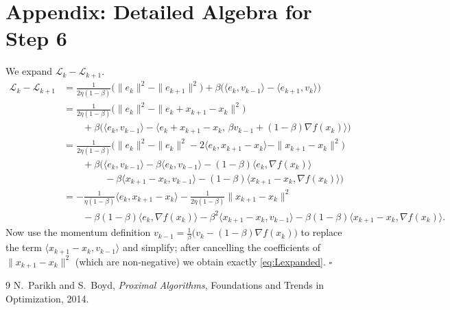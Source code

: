 \documentclass{article}
\newcommand{\grad}{\nabla}
\begin{document}
\section*{Appendix: Detailed Algebra for Step 6}
We expand $\mathcal{L}_{k}-\mathcal{L}_{k+1}$.
\[
\begin{aligned}
\mathcal{L}_{k}-\mathcal{L}_{k+1}
&= \frac{1}{2\eta(1-\beta)}\bigl(\|e_{k}\|^{2}-\|e_{k+1}\|^{2}\bigr)
   +\beta\bigl(\langle e_{k},v_{k-1}\rangle-\langle e_{k+1},v_{k}\rangle\bigr)\\[4pt]
&= \frac{1}{2\eta(1-\beta)}\bigl(\|e_{k}\|^{2}-\|e_{k}+x_{k+1}-x_{k}\|^{2}\bigr)\\
&\qquad +\beta\bigl(\langle e_{k},v_{k-1}\rangle-\langle e_{k}+x_{k+1}-x_{k},\,
           \beta v_{k-1}+(1-\beta)\grad f(x_{k})\rangle\bigr)\\[4pt]
&= \frac{1}{2\eta(1-\beta)}\bigl(\|e_{k}\|^{2}-\|e_{k}\|^{2}
      -2\langle e_{k},x_{k+1}-x_{k}\rangle-\|x_{k+1}-x_{k}\|^{2}\bigr)\\
&\qquad +\beta\bigl(\langle e_{k},v_{k-1}\rangle
      -\beta\langle e_{k},v_{k-1}\rangle
      -(1-\beta)\langle e_{k},\grad f(x_{k})\rangle \\
&\qquad\qquad\; -\beta\langle x_{k+1}-x_{k},v_{k-1}\rangle
      -(1-\beta)\langle x_{k+1}-x_{k},\grad f(x_{k})\rangle \bigr)\\[4pt]
&= -\frac{1}{\eta(1-\beta)}\langle e_{k},x_{k+1}-x_{k}\rangle
   -\frac{1}{2\eta(1-\beta)}\|x_{k+1}-x_{k}\|^{2}\\
&\qquad -\beta(1-\beta)\langle e_{k},\grad f(x_{k})\rangle
   -\beta^{2}\langle x_{k+1}-x_{k},v_{k-1}\rangle
   -\beta(1-\beta)\langle x_{k+1}-x_{k},\grad f(x_{k})\rangle .
\end{aligned}
\]
Now use the momentum definition $v_{k-1}= \frac{1}{\beta}\bigl(v_{k}-(1-\beta)\grad f(x_{k})\bigr)$ to replace the term $\langle x_{k+1}-x_{k},v_{k-1}\rangle$ and simplify; after cancelling the coefficients of $\|x_{k+1}-x_{k}\|^{2}$ (which are non‑negative) we obtain exactly \eqref{eq:Lexpanded}. $\square$

\begin{thebibliography}{9}
N.~Parikh and S.~Boyd, \emph{Proximal Algorithms}, Foundations and Trends in Optimization, 2014.
\end{thebibliography}
\end{document}
